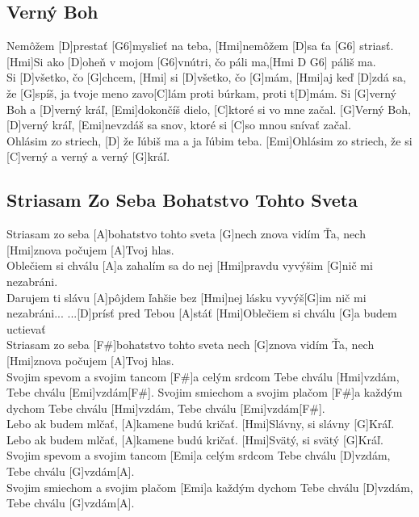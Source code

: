 \documentclass[10pt]{article}
\begin{document}
\begin{Large}
\begin{minipage}{\textwidth}
	\subsection{Verný Boh}
\begin{multicols*}{2}
\begin{guitar}
	[Hmi]Nemôžem [D]prestať [G6]myslieť na teba,
	[Hmi]nemôžem [D]sa ťa [G6] striasť.
	[Hmi]Si ako [D]oheň v mojom [G6]vnútri, 
	čo páli ma,[Hmi D G6] páliš ma.
	\\
	[Hmi] Si [D]všetko, čo [G]chcem,
	[Hmi] si [D]všetko, čo [G]mám,
	[Hmi]aj keď [D]zdá sa, že [G]spíš, 
	ja tvoje meno zavo[C]lám
	proti búrkam, proti t[D]mám.
	\columnbreak
	Si [G]verný Boh a [D]verný kráľ,
	[Emi]dokončíš dielo, [C]ktoré si vo mne začal.
	[G]Verný Boh, [D]verný kráľ, [Emi]nevzdáš sa snov, 
	ktoré si [C]so mnou snívať začal.
	\\
	[G]Ohlásim zo striech,
	[D] že ľúbiš ma a ja ľúbim teba.
	[Emi]Ohlásim zo striech,
	že si [C]verný a verný a verný [G]kráľ.
\end{guitar}
\end{multicols*}
\end{minipage}

\begin{minipage}{\textwidth}
\subsection{Striasam Zo Seba Bohatstvo Tohto Sveta}
\begin{multicols*}{4}
\begin{guitar}
	[D]Striasam zo seba
	[A]bohatstvo tohto sveta
	[G]nech znova vidím Ťa,
	nech [Hmi]znova počujem 
	[A]Tvoj hlas.
	\\
	[D]Oblečiem si chválu
	[A]a zahalím sa do nej
	[Hmi]pravdu vyvýšim
	[G]nič mi nezabráni.
	\\
	[D]Darujem ti slávu
	[A]pôjdem ľahšie bez 
	[Hmi]nej
	lásku vyvýš[G]im
	nič mi nezabráni...
	\columnbreak
	...[D]prísť
	pred Tebou [A]stáť
	[Hmi]Oblečiem si chválu
	[G]a budem uctievať
	\\
	[D]Striasam zo seba
	[F#]bohatstvo tohto sveta
	nech [G]znova vidím Ťa,
	nech [Hmi]znova počujem 
	[A]Tvoj hlas.
	\\
	[D]Svojim spevom 
	a svojim tancom
	[F#]a celým srdcom
	Tebe chválu [Hmi]vzdám,
	Tebe chválu [Emi]vzdám[F#].
	\columnbreak
	[D]Svojim smiechom 
	a svojim plačom
	[F#]a každým dychom
	Tebe chválu [Hmi]vzdám,
	Tebe chválu [Emi]vzdám[F#].
	\\
	[D]Lebo ak budem
	 mlčať,
	[A]kamene budú kričať.
	[Hmi]Slávny, si slávny 
	[G]Kráľ.
	\\
	[D]Lebo ak budem
	mlčať,
	[A]kamene budú kričať.
	[Hmi]Svätý, si svätý [G]Kráľ.
	\columnbreak
	[D]Svojim spevom 
	a svojim tancom
	[Emi]a celým srdcom
	Tebe chválu [D]vzdám,
	Tebe chválu [G]vzdám[A].
	\\
	[D]Svojim smiechom 
	a svojim plačom
	[Emi]a každým dychom
	Tebe chválu [D]vzdám,
	Tebe chválu [G]vzdám[A].
\end{guitar}
\end{multicols*}
\end{minipage}


\end{Large}
\end{document}
